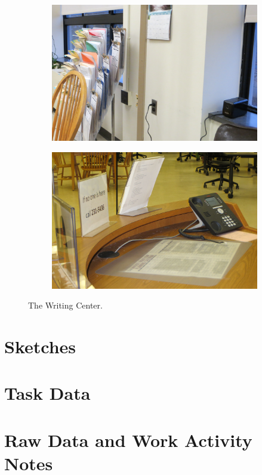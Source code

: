 \documentclass[12pt]{article} %
\begin{document}
\begin{figure}[H]
\begin{subfigure}{.5\linewidth}
  \caption{}
  \label{fig:WC6}
  \end{subfigure}\\[1ex]
  \begin{subfigure}{.5\linewidth}
  \centering
  \includegraphics[width=0.75\linewidth]{WC7}
  \caption{}
  \label{fig:WC7}
  \end{subfigure}%
  \begin{subfigure}{.5\linewidth}
  \centering
  \includegraphics[width=0.75\linewidth]{WC8}
  \caption{}
  \label{fig:WC8}
  \end{subfigure}
  \caption{The Writing Center.}
  \label{fig:TheWritingCenter}
  \end{figure}

\section{Sketches} %

\section{Task Data} %

\section{Raw Data and Work Activity Notes} %
\end{document}
